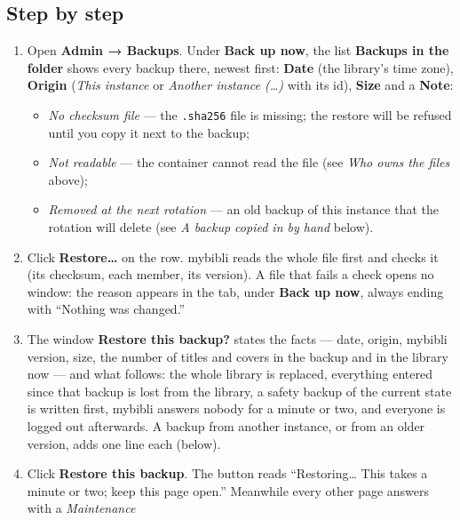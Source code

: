 \subsection*{Step by step}

\begin{enumerate}
  \item Open \textbf{Admin → Backups}. Under \textbf{Back up now}, the
        list \textbf{Backups in the folder} shows every backup there,
        newest first: \textbf{Date} (the library's time zone),
        \textbf{Origin} (\emph{This instance} or \emph{Another instance
        (\dots)} with its id), \textbf{Size} and a \textbf{Note}:
        \begin{itemize}
          \item \emph{No checksum file} --- the \texttt{.sha256} file is
                missing; the restore will be refused until you copy it
                next to the backup;
          \item \emph{Not readable} --- the container cannot read the
                file (see \emph{Who owns the files} above);
          \item \emph{Removed at the next rotation} --- an old backup of
                this instance that the rotation will delete (see
                \emph{A backup copied in by hand} below).
        \end{itemize}
  \item Click \textbf{Restore…} on the row. mybibli reads the whole file
        first and checks it (its checksum, each member, its version).
        A file that fails a check opens no window: the reason appears
        in the tab, under \textbf{Back up now}, always ending with
        ``Nothing was changed.''
  \item The window \textbf{Restore this backup?} states the facts ---
        date, origin, mybibli version, size, the number of titles and
        covers in the backup and in the library now --- and what
        follows: the whole library is replaced, everything entered
        since that backup is lost from the library, a safety backup of
        the current state is written first, mybibli answers nobody for
        a minute or two, and everyone is logged out afterwards. A
        backup from another instance, or from an older version, adds
        one line each (below).
  \item Click \textbf{Restore this backup}. The button reads
        ``Restoring… This takes a minute or two; keep this page open.''
        Meanwhile every other page answers with a \emph{Maintenance}

\end{enumerate}
